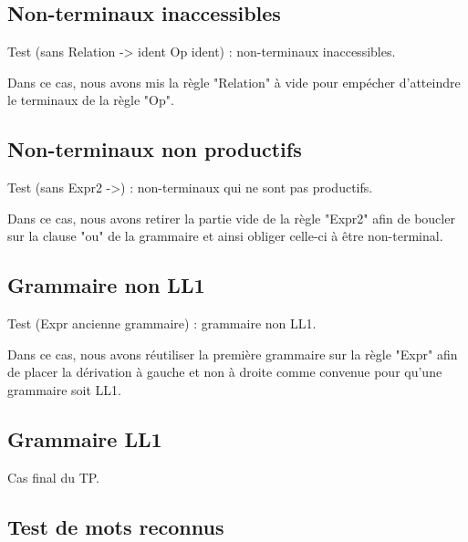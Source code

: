 \documentclass[a4paper,12pt]{article}
\begin{document}
\subsection{Non-terminaux inaccessibles}

\noindent Test (sans Relation -> ident Op ident) : non-terminaux inaccessibles.

\noindent Dans ce cas, nous avons mis la règle "Relation" à vide pour empécher d'atteindre le terminaux de la règle "Op". 



\subsection{Non-terminaux non productifs}

\noindent Test (sans Expr2 ->) : non-terminaux qui ne sont pas productifs.

\noindent Dans ce cas, nous avons retirer la partie vide de la règle "Expr2" afin de boucler sur la clause "ou" de la grammaire et ainsi obliger celle-ci à être non-terminal.




\subsection{Grammaire non LL1}

\noindent Test (Expr ancienne grammaire) : grammaire non LL1.

\noindent Dans ce cas, nous avons réutiliser la première grammaire sur la règle "Expr" afin de placer la dérivation à gauche et non à droite comme convenue pour qu'une grammaire soit LL1.




\subsection{Grammaire LL1}

\noindent Cas final du TP.




\subsection{Test de mots reconnus}
\end{document}
